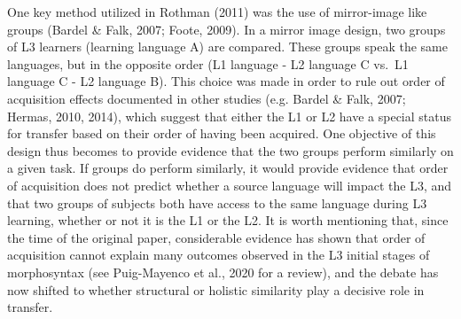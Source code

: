 \documentclass[
  man,floatsintext]{apa6}
\begin{document}
One key method utilized in Rothman (2011) was the use of mirror-image like groups (Bardel \& Falk, 2007; Foote, 2009).
In a mirror image design, two groups of L3 learners (learning language A) are compared.
These groups speak the same languages, but in the opposite order (L1 language - L2 language C vs.~L1 language C - L2 language B).
This choice was made in order to rule out order of acquisition effects documented in other studies (e.g. Bardel \& Falk, 2007; Hermas, 2010, 2014), which suggest that either the L1 or L2 have a special status for transfer based on their order of having been acquired.
One objective of this design thus becomes to provide evidence that the two groups perform similarly on a given task.
If groups do perform similarly, it would provide evidence that order of acquisition does not predict whether a source language will impact the L3, and that two groups of subjects both have access to the same language during L3 learning, whether or not it is the L1 or the L2.
It is worth mentioning that, since the time of the original paper, considerable evidence has shown that order of acquisition cannot explain many outcomes observed in the L3 initial stages of morphosyntax (see Puig-Mayenco et al., 2020 for a review), and the debate has now shifted to whether structural or holistic similarity play a decisive role in transfer.
\end{document}
